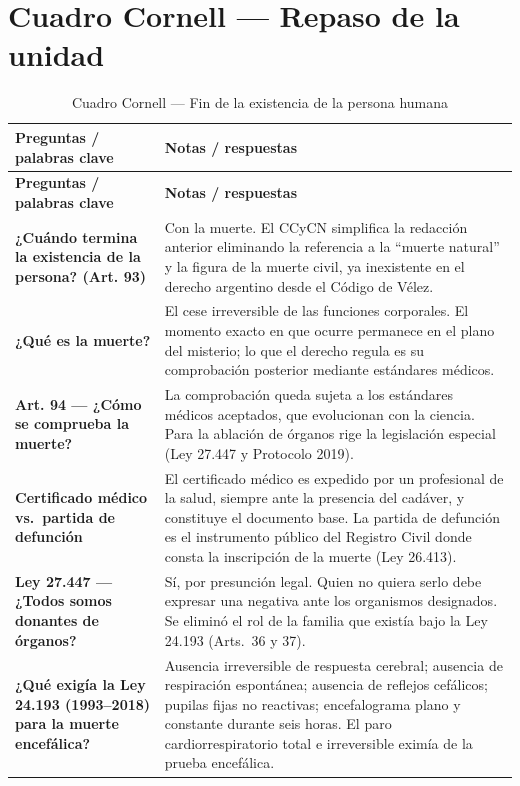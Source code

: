 \documentclass[12pt,oneside]{book}
\begin{document}
\section{Cuadro Cornell --- Repaso de la unidad}
\begin{longtable}{
    >{\raggedright\arraybackslash}p{}
    >{\raggedright\arraybackslash}p{}
}
\caption{Cuadro Cornell --- Fin de la existencia de la persona humana} \\
\toprule
\textbf{Preguntas / palabras clave} & \textbf{Notas / respuestas} \\
\midrule
\endfirsthead

\toprule
\textbf{Preguntas / palabras clave} & \textbf{Notas / respuestas} \\
\midrule
\endhead

\textbf{¿Cuándo termina la existencia de la persona? (Art. 93)} &
Con la muerte. El CCyCN simplifica la redacción anterior eliminando la referencia a la ``muerte natural'' y la figura de la muerte civil, ya inexistente en el derecho argentino desde el Código de Vélez. \\

\textbf{¿Qué es la muerte?} &
El cese irreversible de las funciones corporales. El momento exacto en que ocurre permanece en el plano del misterio; lo que el derecho regula es su comprobación posterior mediante estándares médicos. \\

\textbf{Art. 94 --- ¿Cómo se comprueba la muerte?} &
La comprobación queda sujeta a los estándares médicos aceptados, que evolucionan con la ciencia. Para la ablación de órganos rige la legislación especial (Ley 27.447 y Protocolo 2019). \\

\textbf{Certificado médico vs.\ partida de defunción} &
El certificado médico es expedido por un profesional de la salud, siempre ante la presencia del cadáver, y constituye el documento base. La partida de defunción es el instrumento público del Registro Civil donde consta la inscripción de la muerte (Ley 26.413). \\

\textbf{Ley 27.447 --- ¿Todos somos donantes de órganos?} &
Sí, por presunción legal. Quien no quiera serlo debe expresar una negativa ante los organismos designados. Se eliminó el rol de la familia que existía bajo la Ley 24.193 (Arts.\ 36 y 37). \\

\textbf{¿Qué exigía la Ley 24.193 (1993--2018) para la muerte encefálica?} &
Ausencia irreversible de respuesta cerebral; ausencia de respiración espontánea; ausencia de reflejos cefálicos; pupilas fijas no reactivas; encefalograma plano y constante durante seis horas. El paro cardiorrespiratorio total e irreversible eximía de la prueba encefálica. \\


\end{longtable}
\end{document}
